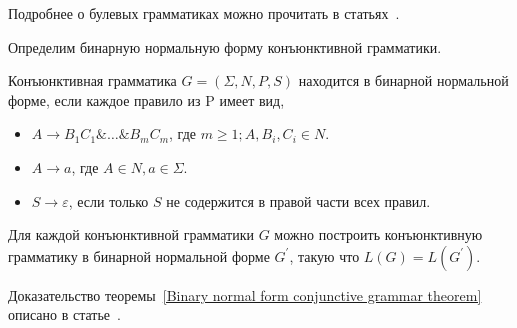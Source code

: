 Подробнее о булевых грамматиках можно прочитать в статьях~\cite{Okhotin:2003:BG:1758089.1758123,Okhotin:2014:PMM:2565359.2565379}.

Определим бинарную нормальную форму конъюнктивной грамматики.
\begin{definition}
    Конъюнктивная грамматика $G = (\Sigma, N, P, S)$ находится в бинарной нормальной форме, если каждое правило из P имеет вид,
    \begin{itemize}
        \item $A \rightarrow B_1 C_1 \& \ldots\& B_m C_m$, где $m \geqslant 1; A,B_i,C_i \in N$.
        \item $A \rightarrow a$, где $A \in N, a \in \Sigma$.
        \item $S \rightarrow \varepsilon$, если только $S$ не содержится в правой части всех правил.
    \end{itemize}
\end{definition}

\begin{theorem}\label{Binary normal form conjunctive grammar theorem}
    Для каждой конъюнктивной грамматики $G$ можно построить конъюнктивную грамматику в бинарной нормальной форме $G^{'}$, такую что $L(G) = L(G^{'})$.
\end{theorem}
Доказательство теоремы~\ref{Binary normal form conjunctive grammar theorem} описано в статье~\cite{DBLP:journals/jalc/Okhotin01}.



